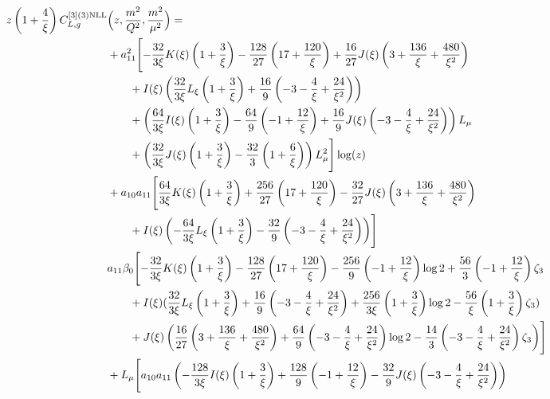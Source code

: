 \documentclass[a4paper]{article}
\begin{document}
\begin{equation}
	\begin{split}
		z \left(1 + \frac{4}{\xi}\right) C_{L,g}^{[3](3) \rm NLL}&\Bigl(z,\frac{m^2}{Q^2},\frac{m^2}{\mu^2}\Bigr)= \\
		& + a_{11}^2 \Biggl[ -\frac{32}{3 \xi} K(\xi) \left(1 + \frac{3}{\xi}\right) - \frac{128}{27} \left(17 + \frac{120}{\xi}\right) + \frac{16}{27} J(\xi) \left(3 + \frac{136}{\xi} + \frac{480}{\xi^2}\right) \\
		&\qquad + I(\xi) \left(\frac{32}{3\xi} L_\xi \left(1 + \frac{3}{\xi}\right) + \frac{16}{9} \left(-3 - \frac{4}{\xi} + \frac{24}{\xi^2}\right)\right) \\
	 	& \qquad + \left(\frac{64}{3\xi} I(\xi) \left(1 + \frac{3}{\xi}\right) - \frac{64}{9} \left(-1 + \frac{12}{\xi}\right) + \frac{16}{9} J(\xi) \left(-3 - \frac{4}{\xi} + \frac{24}{\xi^2}\right)\right) L_\mu \\
		& \qquad + \left(\frac{32}{3\xi} J(\xi) \left(1 + \frac{3}{\xi}\right) - \frac{32}{3} \left(1 + \frac{6}{\xi}\right)\right) L_\mu^2\Biggr] \log(z) \\
		& + a_{10} a_{11} \Biggl[ \frac{64}{3\xi} K(\xi) \left(1 + \frac{3}{\xi}\right) + \frac{256}{27} \left(17 + \frac{120}{\xi}\right) - \frac{32}{27} J(\xi) \left(3 + \frac{136}{\xi} + \frac{480}{\xi^2} \right) \\
		& \qquad + I(\xi) \left(-\frac{64}{3\xi} L_\xi \left(1 + \frac{3}{\xi}\right) - \frac{32}{9} \left(-3 - \frac{4}{\xi} + \frac{24}{\xi^2}\right)\right)\Biggr] \\
		& a_{11} \beta_0 \Biggl[-\frac{32}{3\xi} K(\xi) \left(1 + \frac{3}{\xi}\right) - \frac{128}{27} \left(17 + \frac{120}{\xi}\right) -	\frac{256}{9} \left(-1 + \frac{12}{\xi}\right) \log 2 + \frac{56}{3} \left(-1 + \frac{12}{\xi}\right) \zeta_3 \\
		& \qquad + I(\xi) (\frac{32}{3\xi} L_\xi \left(1 + \frac{3}{\xi}\right) + \frac{16}{9} \left(-3 - \frac{4}{\xi} + \frac{24}{\xi^2}\right) + \frac{256}{3\xi} \left(1 + \frac{3}{\xi}\right) \log 2 - \frac{56}{\xi} \left(1 + \frac{3}{\xi}\right) \zeta_3) \\
		& \qquad + J(\xi) \left( \frac{16}{27} \left(3 + \frac{136}{\xi} + \frac{480}{\xi^2}\right) + \frac{64}{9} \left(-3 - \frac{4}{\xi} + \frac{24}{\xi^2}\right) \log 2 - \frac{14}{3} \left(-3 - \frac{4}{\xi} + \frac{24}{\xi^2}\right) \zeta_3\right)\Biggr] \\
		& + L_\mu \Biggl[ a_{10} a_{11} \left(-\frac{128}{3\xi} I(\xi) \left(1 + \frac{3}{\xi}\right) + \frac{128}{9} \left(-1 + \frac{12}{\xi}\right) - \frac{32}{9} J(\xi) \left(-3 - \frac{4}{\xi} + \frac{24}{\xi^2}\right)\right) \\

\end{split}
\end{equation}
\end{document}

